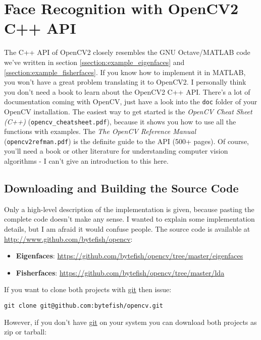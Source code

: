 \section{Face Recognition with OpenCV2 C++ API}
The C++ API of OpenCV2 closely resembles the GNU Octave/MATLAB code we've written in section \ref{ssection:example_eigenfaces} and \ref{ssection:example_fisherfaces}. If you know how to implement it in MATLAB, you won't have a great problem translating it to OpenCV2. I personally think you don't need a book to learn about the OpenCV2 C++ API. There's a lot of documentation coming with OpenCV, just have a look into the \lstinline|doc| folder of your OpenCV installation. The easiest way to get started is the \textit{OpenCV Cheat Sheet (C++)} (\lstinline|opencv_cheatsheet.pdf|), because it shows you how to use all the functions with examples. The \textit{The OpenCV Reference Manual} (\lstinline|opencv2refman.pdf|) is the definite guide to the API (500+ pages). Of course, you'll need a book or other literature for understanding computer vision algorithms - I can't give an introduction to this here.

\subsection{Downloading and Building the Source Code}

Only a high-level description of the implementation is given, because pasting the complete code doesn't make any sense. I wanted to explain some implementation details, but I am afraid it would confuse people. The source code is available at \url{http://www.github.com/bytefish/opencv}:

\begin{itemize}
	\item \textbf{Eigenfaces}: \url{https://github.com/bytefish/opencv/tree/master/eigenfaces}
	\item \textbf{Fisherfaces}: \url{https://github.com/bytefish/opencv/tree/master/lda}
\end{itemize}

If you want to clone both projects with \href{http://git-scm.com/}{git} then issue:

\begin{lstlisting}
git clone git@github.com:bytefish/opencv.git
\end{lstlisting}

However, if you don't have \href{http://git-scm.com/}{git} on your system you can download both projects as zip or tarball:

